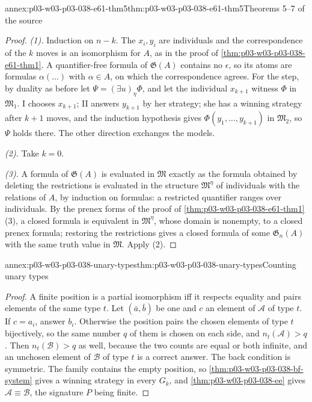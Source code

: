 \begin{annexitem}{annex:p03-w03-p03-038-e61-thm5}{thm:p03-w03-p03-038-e61-thm5}{Theorems 5--7 of the source}
\begin{proof}
\emph{(1).} Induction on \(n-k\). The \(x_i,y_i\) are individuals and the
correspondence of the \(k\) moves is an isomorphism for \(A\), as in the
proof of \cref{thm:p03-w03-p03-038-e61-thm1}. A quantifier-free formula of
\(\mathfrak G(A)\) contains no \(\epsilon\), so its atoms are formulas
\(\alpha(\ldots)\) with \(\alpha\in A\), on which the correspondence agrees.
For the step, by duality as before let \(\Psi=(\exists u)_\eta\Phi\), and
let the individual \(x_{k+1}\) witness \(\Phi\) in \(\mathfrak M_1\). I
chooses \(x_{k+1}\); II answers \(y_{k+1}\) by her strategy; she has a
winning strategy after \(k+1\) moves, and the induction hypothesis gives
\(\Phi(y_1,\ldots,y_{k+1})\) in \(\mathfrak M_2\), so \(\Psi\) holds there.
The other direction exchanges the models.

\emph{(2).} Take \(k=0\).

\emph{(3).} A formula of \(\mathfrak G(A)\) is evaluated in \(\mathfrak M\)
exactly as the formula obtained by deleting the restrictions is evaluated in
the structure \(\mathfrak M^\eta\) of individuals with the relations of
\(A\), by induction on formulas: a restricted quantifier ranges over
individuals. By the prenex forms of the proof of
\cref{thm:p03-w03-p03-038-e61-thm1}(3), a closed formula is equivalent in
\(\mathfrak M^\eta\), whose domain is nonempty, to a closed prenex formula;
restoring the restrictions gives a closed formula of some
\(\mathfrak G_n(A)\) with the same truth value in \(\mathfrak M\). Apply
(2).
\end{proof}
\end{annexitem}

\begin{annexitem}{annex:p03-w03-p03-038-unary-types}{thm:p03-w03-p03-038-unary-types}{Counting unary types}
\begin{proof}
A finite position is a partial isomorphism iff it respects equality and
pairs elements of the same type \(t\). Let \((\bar a,\bar b)\) be one and
\(c\) an element of \(\mathcal A\) of type \(t\). If \(c=a_i\), answer
\(b_i\). Otherwise the position pairs the chosen elements of type \(t\)
bijectively, so the same number \(q\) of them is chosen on each side, and
\(n_t(\mathcal A)>q\). Then \(n_t(\mathcal B)>q\) as well, because the two
counts are equal or both infinite, and an unchosen element of
\(\mathcal B\) of type \(t\) is a correct answer. The back condition is
symmetric. The family contains the empty position, so
\cref{thm:p03-w03-p03-038-bf-system} gives a winning strategy in every
\(G_k\), and \cref{thm:p03-w03-p03-038-ee} gives
\(\mathcal A\equiv\mathcal B\), the signature \(P\) being finite.
\end{proof}
\end{annexitem}

